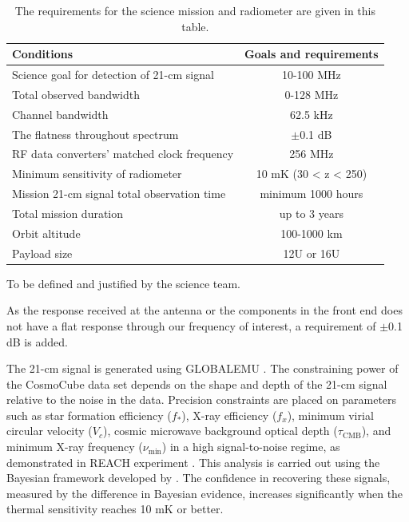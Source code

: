 \documentclass[fleqn,usenatbib]{rasti}
\begin{document}
\begin{table}
\caption{The requirements for the science mission and radiometer are given in this table.}
\centering \footnotesize
\label{table:Science mission requirements.}
\begin{threeparttable}
\begin{tabular}{l c}
\toprule
Conditions & Goals and requirements\\ 
\midrule
Science goal for detection of 21-cm signal & 10-100 MHz \\
Total observed bandwidth & 0-128 MHz \\
Channel bandwidth & 62.5 kHz\tnote{*}  \\
The flatness throughout spectrum & $\pm$0.1 dB\tnote{*}\\ 
RF data converters’ matched clock frequency & 256 MHz \\
Minimum sensitivity of radiometer & 10 mK (30 < z < 250)\\
Mission 21-cm signal total observation time & minimum 1000 hours\\
Total mission duration & up to 3 years\tnote{*}\\
Orbit altitude & 100-1000 km\tnote{*}\\
Payload size & 12U or 16U\tnote{*}\\
\bottomrule
\end{tabular}
\begin{tablenotes}
\item[*] To be defined and justified by the science team.
\end{tablenotes}
\end{threeparttable}
\end{table}

As the response received at the antenna or the components in the front end does not have a flat response through our frequency of interest, a requirement of $\pm$0.1 dB is added. 

The 21-cm signal is generated using GLOBALEMU \citep{Bevins2021}. The constraining power of the CosmoCube data set depends on the shape and depth of the 21-cm signal relative to the noise in the data. Precision constraints are placed on parameters such as star formation efficiency (\(f_*\)), X-ray efficiency (\(f_x\)), minimum virial circular velocity (\(V_c\)), cosmic microwave background optical depth (\(\tau_{\text{CMB}}\)), and minimum X-ray frequency (\(\nu_{\text{min}}\)) in a high signal-to-noise regime, as demonstrated in REACH experiment \citep{Acedo2022}. This analysis is carried out using the Bayesian framework developed by \citep{Anstey2021}. The confidence in recovering these signals, measured by the difference in Bayesian evidence, increases significantly when the thermal sensitivity reaches 10 mK or better.
\end{document}

